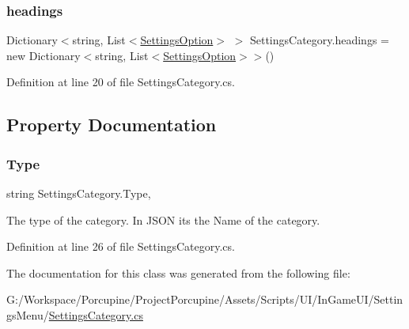 \subsubsection{\texorpdfstring{headings}{headings}}
{\footnotesize\ttfamily Dictionary$<$string, List$<$\hyperlink{struct_settings_option}{Settings\+Option}$>$ $>$ Settings\+Category.\+headings = new Dictionary$<$string, List$<$\hyperlink{struct_settings_option}{Settings\+Option}$>$$>$()}



Definition at line 20 of file Settings\+Category.\+cs.



\subsection{Property Documentation}
\mbox{\label{class_settings_category_a8723422438f66d28afc7be0e990d8c10}} 
\subsubsection{\texorpdfstring{Type}{Type}}
{\footnotesize\ttfamily string Settings\+Category.\+Type\hspace{0.3cm}{\ttfamily [get]}, {\ttfamily [set]}}



The type of the category. In J\+S\+ON its the \textquotesingle{}Name\textquotesingle{} of the category. 



Definition at line 26 of file Settings\+Category.\+cs.



The documentation for this class was generated from the following file\+:\begin{DoxyCompactItemize}
\item 
G\+:/\+Workspace/\+Porcupine/\+Project\+Porcupine/\+Assets/\+Scripts/\+U\+I/\+In\+Game\+U\+I/\+Settings\+Menu/\hyperlink{_settings_category_8cs}{Settings\+Category.\+cs}\end{DoxyCompactItemize}
